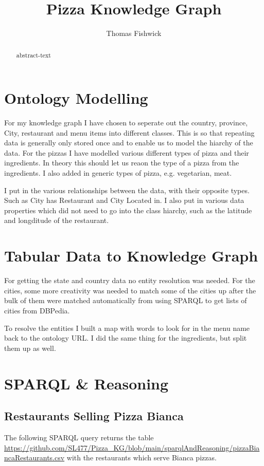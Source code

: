 \documentclass[11pt]{report} %
\title{Pizza Knowledge Graph}
\author{Thomas Fishwick}
\begin{document}
\begin{minipage}{\textwidth}
	\maketitle

	\begin{abstract}
		abstract-text
	\end{abstract}
\end{minipage}

\tableofcontents

\chapter{Ontology Modelling}

For my knowledge graph I have chosen to seperate out the country, province, City, restaurant and menu items into different classes.
This is so that repeating data is generally only stored once and to enable us to model the hiarchy of the data.
For the pizzas I have modelled various different types of pizza and their ingredients.
In theory this should let us reaon the type of a pizza from the ingredients. I also added in generic types of pizza, e.g. vegetarian, meat.

I put in the various relationships between the data, with their opposite types. Such as City has Restaurant and City Located in.
I also put in various data properties which did not need to go into the class hiarchy, such as the latitude and longditude of the restaurant.

\chapter{Tabular Data to Knowledge Graph}

For getting the state and country data no entity resolution was needed.
For the cities, some more creativity was needed to match some of the cities up after the bulk of them were matched automatically from using SPARQL to get lists of cities from DBPedia.

To resolve the entities I built a map with words to look for in the menu name back to the ontology URL. I did the same thing for the ingredients, but split them up as well.

\chapter{SPARQL \& Reasoning}
\section{Restaurants Selling Pizza Bianca}
The following SPARQL query returns the table \url{https://github.com/SL477/Pizza_KG/blob/main/sparqlAndReasoning/pizzaBiancaRestaurants.csv} with the restaurants which serve Bianca pizzas.
\end{document}
